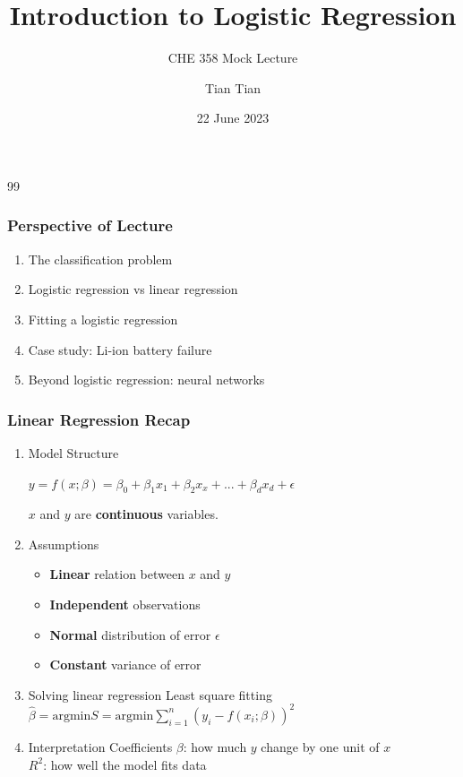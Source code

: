 \documentclass[10pt,aspectratio=169]{beamer}
\title{\Large \bfseries Introduction to Logistic Regression}
\subtitle{\large CHE 358 Mock Lecture}
\author{\large Tian Tian}
\date{\large 22 June 2023}
\begin{document}
99
{
\frame{\titlepage}
}


\begin{frame}[c]
\frametitle{Perspective of Lecture}
\begin{enumerate}
\item The classification problem
\vfill \item Logistic regression vs linear regression
\vfill \item Fitting a logistic regression
\vfill \item Case study: Li-ion battery failure
\vfill \item Beyond logistic regression: neural networks
\end{enumerate}
\end{frame}


\begin{frame}
  \frametitle{Linear Regression Recap}
  \begin{enumerate}
  \item Model Structure

    \vfill
    $y = f(x; \beta) =  β_{0} + β_{1} x_{1} + β_{2} x_{x} + ... + β_{d} x_{d} + \epsilon$

    $x$ and $y$ are \textbf{continuous} variables.
    
    \vfill \item Assumptions

    \vfill
    \begin{itemize}
    \item \textbf{Linear} relation between $x$ and $y$
    \item \textbf{Independent} observations
    \item \textbf{Normal} distribution of error $\epsilon$
    \item \textbf{Constant} variance of error
    \end{itemize}


 
    \vfill \item Solving linear regression
        \vfill
    Least square fitting $\hat{\beta} = \mathrm{argmin} S = \mathrm{argmin} \sum_{i=1}^{n} (y_{i} - f(x_{i}; \beta))^{2}$
    
    \vfill \item Interpretation
    \vfill
    Coefficients $\beta$: how much $y$ change by one unit of $x$\\
    $R^{2}$: how well the model fits data
    
    
  \end{enumerate}

\end{frame}
\end{document}
